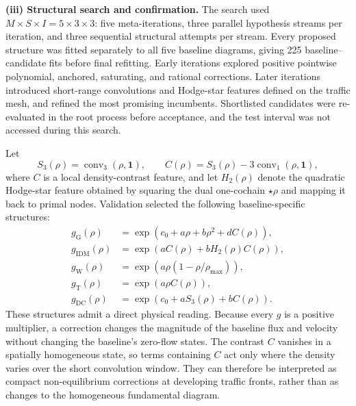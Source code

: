 \noindent\textbf{(iii) Structural search and confirmation.}
The search used $M\times S\times I=5\times3\times3$: five meta-iterations,
three parallel hypothesis streams per iteration, and three sequential
structural attempts per stream. Every proposed structure was fitted separately
to all five baseline diagrams, giving 225 baseline--candidate fits before final
refitting. Early iterations explored positive pointwise polynomial, anchored,
saturating, and rational corrections. Later iterations introduced short-range
convolutions and Hodge-star features defined on the traffic mesh, and refined
the most promising incumbents. Shortlisted candidates were re-evaluated in the
root process before acceptance, and the test interval was not accessed during
this search.

Let
\begin{equation}
    S_3(\rho)=\operatorname{conv}_3(\rho,\mathbf{1}),
    \qquad
    C(\rho)=S_3(\rho)-3\operatorname{conv}_1(\rho,\mathbf{1}),
\end{equation}
where $C$ is a local density-contrast feature, and let $H_2(\rho)$ denote the
quadratic Hodge-star feature obtained by squaring the dual one-cochain
$\star\rho$ and mapping it back to primal nodes. Validation selected the
following baseline-specific structures:
\begin{align}
    g_{\mathrm{G}}(\rho)
        &= \exp\!\left(c_0+a\rho+b\rho^2+dC(\rho)\right), \\
    g_{\mathrm{IDM}}(\rho)
        &= \exp\!\left(aC(\rho)+bH_2(\rho)C(\rho)\right), \\
    g_{\mathrm{W}}(\rho)
        &= \exp\!\left(a\rho\left(1-\rho/\rho_{\max}\right)\right), \\
    g_{\mathrm{T}}(\rho)
        &= \exp\!\left(a\rho C(\rho)\right), \\
    g_{\mathrm{DC}}(\rho)
        &= \exp\!\left(c_0+aS_3(\rho)+bC(\rho)\right).
    \label{eq:traffic-selected-corrections}
\end{align}
These structures admit a direct physical reading. Because every $g$ is a
positive multiplier, a correction changes the magnitude of the baseline flux
and velocity without changing the baseline's zero-flow states. The contrast
$C$ vanishes in a spatially homogeneous state, so terms containing $C$ act
only where the density varies over the short convolution window. They can
therefore be interpreted as compact non-equilibrium corrections at developing
traffic fronts, rather than as changes to the homogeneous fundamental diagram.

